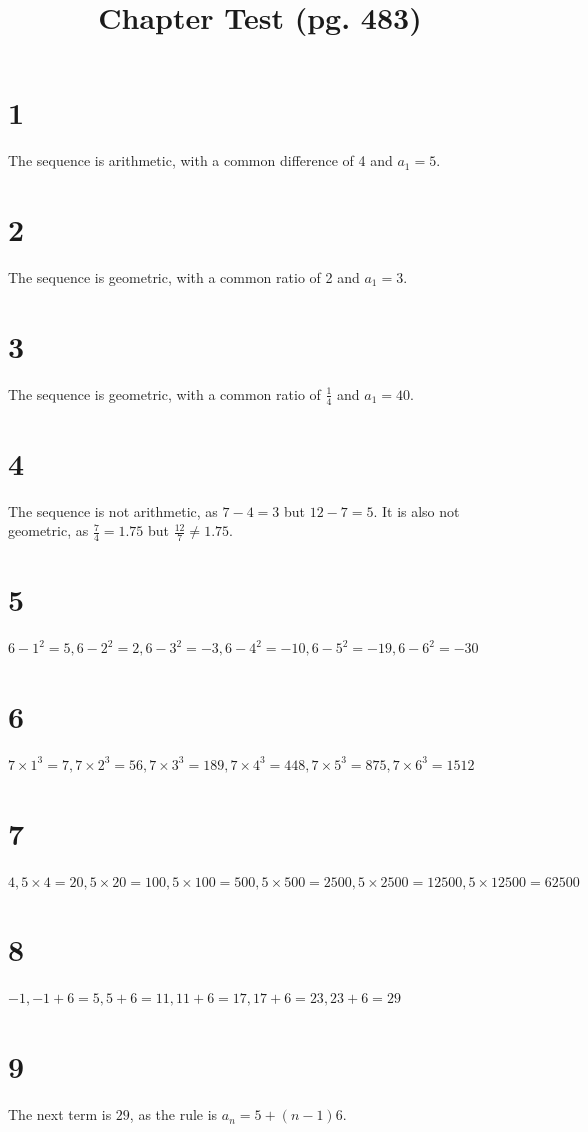 \documentclass{article}
\title{Chapter Test (pg. 483)}
\theoremstyle{definition}
\newcommand{\?}{\stackrel{?}{=}}
\begin{document}
\maketitle

\section*{1}
The sequence is arithmetic, with a common difference of 4 and $a_1=5$.

\section*{2}
The sequence is geometric, with a common ratio of 2 and $a_1=3$.

\section*{3}
The sequence is geometric, with a common ratio of $\frac{1}{4}$ and $a_1=40$.

\section*{4}
The sequence is not arithmetic, as $7-4=3$ but $12-7=5$. It is also not geometric,  as $\frac{7}{4}=1.75$ but
$\frac{12}{7}\ne 1.75$.

\section*{5}
$6-1^2=5,6-2^2=2,6-3^2=-3,6-4^2=-10,6-5^2=-19,6-6^2=-30$

\section*{6}
$7\times 1^3=7,7\times 2^3=56,7\times 3^3=189,7\times 4^3=448,7\times 5^3=875,7\times 6^3=1512$

\section*{7}
$4,5\times 4=20,5\times 20=100,5\times 100=500,5\times 500=2500,5\times 2500=12500,5\times 12500=62500$ 

\section*{8}
$-1,-1+6=5,5+6=11,11+6=17,17+6=23,23+6=29$

\section*{9}
The next term is $29$, as the rule is $a_n=5+(n-1)6$.
\end{document}
